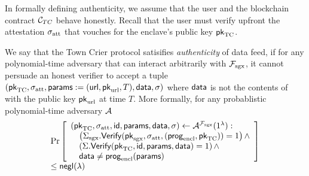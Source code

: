 In formally defining 
authenticity, 
we assume that the user and the blockchain
contract ${\cal C}_{TC}$ behave honestly.
Recall that the user must verify 
upfront the attestation ${\sigma_{\textrm{att}}}$ 
that vouches 
for the enclave's public key ${\sf pk}_{\textrm{TC}}$.


\begin{definition}[Authenticity]
We say that the Town Crier protocol 
satisifies {\it authenticity} of data feed,
if for any polynomial-time adversary
that can interact arbitrarily with $\mathcal{F}_{\textrm{sgx}}$,
it cannot 
persuade an honest verifier to accept
a tuple $({\sf pk}_{\textrm{TC}}, {\sigma_{\textrm{att}}}, {\sf params}:=({{\sf url}}, {\sf pk}_{\textrm{url}}, T), {\sf data}, \sigma)$
where ${\sf data}$ is not 
the contents of 
\weburl with the public key ${\sf pk}_{\textrm{url}}$ at time $T$.
More formally, 
for any probablistic polynomial-time adversary $\mathcal{A}$
\[
\begin{array}{l}
\Pr\left[
\begin{array}{l}
({\sf pk}_{\textrm{TC}}, {\sigma_{\textrm{att}}}, {\sf id}, {\sf params}, {\sf data}, \sigma) \leftarrow 
\mathcal{A}^{\mathcal{F}_{\textrm{sgx}}}(1^\lambda) :\\
\quad \left({\Sigma_{\textrm{sgx}}}.{\sf Verify}({\sf pk}_{\mathrm{sgx}}, {\sigma_{\textrm{att}}}, ({\sf prog}_{\textrm{encl}}, {\sf pk}_{\textrm{TC}})) = 1\right) \wedge \\
\quad \left(\Sigma.{\sf Verify}({\sf pk}_{\textrm{TC}}, {\sf id}, {\sf params}, {\sf data})  = 1\right) \wedge\\
\quad {\sf data} \neq {\sf prog}_{\textrm{encl}}({\sf params}) 
\end{array}
\right] \\[3pt] 
\leq {\sf negl}(\lambda)
\end{array}
\]
\label{defn:auth}
\end{definition}


